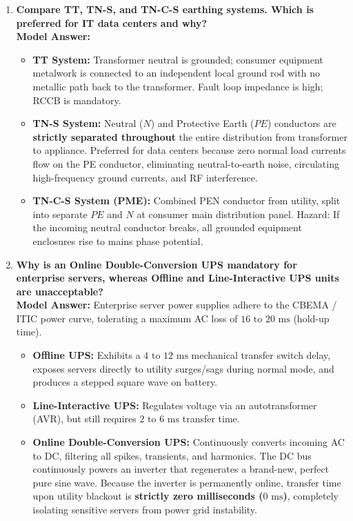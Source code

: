 \begin{enumerate}[leftmargin=*,label=\textbf{Q\arabic*.}]
    \item \textbf{Compare TT, TN-S, and TN-C-S earthing systems. Which is preferred for IT data centers and why?} \\
    \textbf{Model Answer:}
    \begin{itemize}
        \item \textbf{TT System:} Transformer neutral is grounded; consumer equipment metalwork is connected to an independent local ground rod with no metallic path back to the transformer. Fault loop impedance is high; RCCB is mandatory.
        \item \textbf{TN-S System:} Neutral ($N$) and Protective Earth ($PE$) conductors are \textbf{strictly separated throughout} the entire distribution from transformer to appliance. Preferred for data centers because zero normal load currents flow on the PE conductor, eliminating neutral-to-earth noise, circulating high-frequency ground currents, and RF interference.
        \item \textbf{TN-C-S System (PME):} Combined PEN conductor from utility, split into separate $PE$ and $N$ at consumer main distribution panel. Hazard: If the incoming neutral conductor breaks, all grounded equipment enclosures rise to mains phase potential.
    \end{itemize}

    \item \textbf{Why is an Online Double-Conversion UPS mandatory for enterprise servers, whereas Offline and Line-Interactive UPS units are unacceptable?} \\
    \textbf{Model Answer:} Enterprise server power supplies adhere to the CBEMA / ITIC power curve, tolerating a maximum AC loss of $16\text{ to }20\text{ ms}$ (hold-up time).
    \begin{itemize}
        \item \textbf{Offline UPS:} Exhibits a $4\text{ to }12\text{ ms}$ mechanical transfer switch delay, exposes servers directly to utility surges/sags during normal mode, and produces a stepped square wave on battery.
        \item \textbf{Line-Interactive UPS:} Regulates voltage via an autotransformer (AVR), but still requires $2\text{ to }6\text{ ms}$ transfer time.
        \item \textbf{Online Double-Conversion UPS:} Continuously converts incoming AC to DC, filtering all spikes, transients, and harmonics. The DC bus continuously powers an inverter that regenerates a brand-new, perfect pure sine wave. Because the inverter is permanently online, transfer time upon utility blackout is \textbf{strictly zero milliseconds ($0\text{ ms}$)}, completely isolating sensitive servers from power grid instability.
    \end{itemize}


\end{enumerate}
